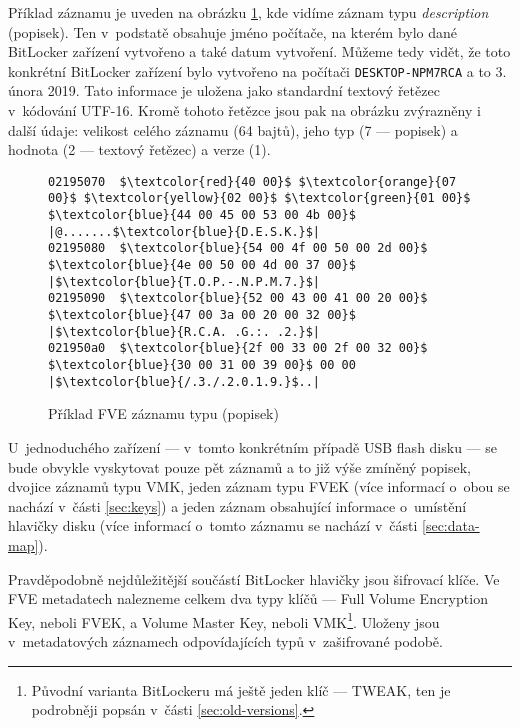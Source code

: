 
Příklad  záznamu je uveden na obrázku \ref{fig:fve-entry-desc}, kde vidíme záznam typu \emph{description} (popisek). Ten v~podstatě obsahuje jméno počítače, na kterém bylo dané BitLocker zařízení vytvořeno a také datum vytvoření. Můžeme tedy vidět, že toto konkrétní BitLocker zařízení bylo vytvořeno na počítači \texttt{DESKTOP-NPM7RCA} a to 3. února 2019. Tato informace je uložena jako standardní textový řetězec v~kódování UTF-16. Kromě tohoto řetězce jsou pak na obrázku zvýrazněny i další údaje: velikost celého záznamu (64 bajtů), jeho typ (7 --- popisek) a hodnota (2 --- textový řetězec) a verze (1).


\begin{figure}[h]
		\centering
		\captionsetup{width=0.65\linewidth}
\begin{lstlisting}[frame=none, escapechar=$, basicstyle=\ttfamily\small, columns=fullflexible, keepspaces=true]
02195070  $\textcolor{red}{40 00}$ $\textcolor{orange}{07 00}$ $\textcolor{yellow}{02 00}$ $\textcolor{green}{01 00}$  $\textcolor{blue}{44 00 45 00 53 00 4b 00}$ |@.......$\textcolor{blue}{D.E.S.K.}$|
02195080  $\textcolor{blue}{54 00 4f 00 50 00 2d 00}$  $\textcolor{blue}{4e 00 50 00 4d 00 37 00}$ |$\textcolor{blue}{T.O.P.-.N.P.M.7.}$|
02195090  $\textcolor{blue}{52 00 43 00 41 00 20 00}$  $\textcolor{blue}{47 00 3a 00 20 00 32 00}$ |$\textcolor{blue}{R.C.A. .G.:. .2.}$|
021950a0  $\textcolor{blue}{2f 00 33 00 2f 00 32 00}$  $\textcolor{blue}{30 00 31 00 39 00}$ 00 00 |$\textcolor{blue}{/.3./.2.0.1.9.}$..|
\end{lstlisting}
		\caption{Příklad FVE záznamu typu  (popisek)}
		\label{fig:fve-entry-desc}
\end{figure}

U~jednoduchého zařízení --- v~tomto konkrétním případě USB flash disku --- se bude obvykle vyskytovat pouze pět záznamů a to již výše zmíněný popisek, dvojice záznamů typu VMK, jeden záznam typu FVEK (více informací o~obou se nachází v~části \ref{sec:keys}) a jeden záznam obsahující informace o~umístění hlavičky disku (více informací o~tomto záznamu se nachází v~části \ref{sec:data-map}).

\label{sec:keys}

Pravděpodobně nejdůležitější součástí BitLocker hlavičky jsou šifrovací klíče. Ve FVE metadatech nalezneme celkem dva typy klíčů --- Full Volume Encryption Key, neboli FVEK, a Volume Master Key, neboli VMK\footnote{Původní varianta BitLockeru má ještě jeden klíč --- TWEAK, ten je podrobněji popsán v~části \ref{sec:old-versions}.}. Uloženy jsou v~metadatových záznamech odpovídajících typů v~zašifrované podobě.

